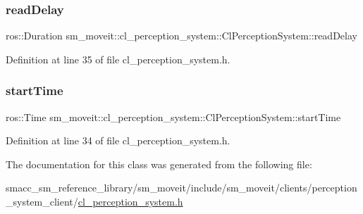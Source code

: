 \subsubsection{\texorpdfstring{read\+Delay}{readDelay}}
{\footnotesize\ttfamily ros\+::\+Duration sm\+\_\+moveit\+::cl\+\_\+perception\+\_\+system\+::\+Cl\+Perception\+System\+::read\+Delay}



Definition at line 35 of file cl\+\_\+perception\+\_\+system.\+h.

\mbox{\label{classsm__moveit_1_1cl__perception__system_1_1ClPerceptionSystem_a115fa9b61255bafa00931484f60d993a}} 
\subsubsection{\texorpdfstring{start\+Time}{startTime}}
{\footnotesize\ttfamily ros\+::\+Time sm\+\_\+moveit\+::cl\+\_\+perception\+\_\+system\+::\+Cl\+Perception\+System\+::start\+Time}



Definition at line 34 of file cl\+\_\+perception\+\_\+system.\+h.



The documentation for this class was generated from the following file\+:\begin{DoxyCompactItemize}
\item 
smacc\+\_\+sm\+\_\+reference\+\_\+library/sm\+\_\+moveit/include/sm\+\_\+moveit/clients/perception\+\_\+system\+\_\+client/\hyperlink{cl__perception__system_8h}{cl\+\_\+perception\+\_\+system.\+h}\end{DoxyCompactItemize}
